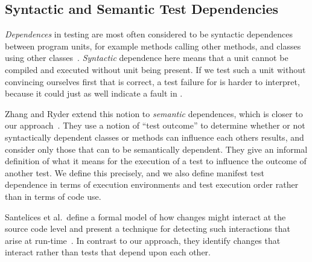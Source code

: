 
\subsection{Syntactic and Semantic Test Dependencies}

\emph{Dependences} in testing are most often considered
to be syntactic dependences between program units, for example
methods calling other methods, and classes using other classes~\cite{bergelsonetal:EEE:2006,briandetal:SEKE:2002}. 
\emph{Syntactic} dependence here means that a unit  cannot be
compiled and executed without unit  being present. If we test
such a unit  without convincing ourselves first that 
is correct, a test failure for  is harder to interpret,
because it could just as well indicate a fault in .

Zhang and Ryder extend this notion to 
\emph{semantic} dependences,
which is closer to our approach~\cite{zhangetal:TR:2006}. 
They use a notion of
``test outcome'' to determine whether or not syntactically dependent
classes or methods can influence each others results, and consider
only those that can to be semantically dependent.
They give an informal definition of what it means for the execution of a
test to influence the outcome of another test.  We define
this precisely, and we also define manifest test dependence in terms
of execution environments
and test execution order rather than in terms of code use.

Santelices et al.\ define a formal model of how changes might interact
at the source code level and present a technique for detecting such
interactions that arise at
run-time~\cite{Santelices:2010:PDR:1828417.1828487}.  In contrast to
our approach, they identify changes that interact rather than tests
that depend upon each other.




